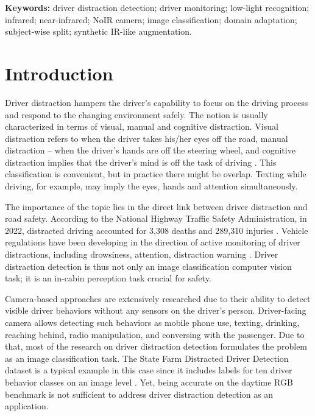 \documentclass[11pt,a4paper]{article}
\let\oldsection\section
\renewcommand{\section}{\FloatBarrier\Needspace{9\baselineskip}\oldsection}
\begin{document}
\vspace{6pt}
\noindent
\textbf{Keywords:} driver distraction detection; driver monitoring; low-light recognition; infrared; near-infrared; NoIR camera; image classification; domain adaptation; subject-wise split; synthetic IR-like augmentation.

\vspace{6pt}

\section{Introduction}

Driver distraction hampers the driver's capability to focus on the driving process and respond to the changing environment safely. The notion is usually characterized in terms of visual, manual and cognitive distraction. Visual distraction refers to when the driver takes his/her eyes off the road, manual distraction – when the driver's hands are off the steering wheel, and cognitive distraction implies that the driver's mind is off the task of driving \parencite{regan2011,kashevnik2021}. This classification is convenient, but in practice there might be overlap. Texting while driving, for example, may imply the eyes, hands and attention simultaneously.

The importance of the topic lies in the direct link between driver distraction and road safety. According to the National Highway Traffic Safety Administration, in 2022, distracted driving accounted for 3,308 deaths and 289,310 injuries \parencite{nhtsa2024}. Vehicle regulations have been developing in the direction of active monitoring of driver distractions, including drowsiness, attention, distraction warning \parencite{eurlex2024}. Driver distraction detection is thus not only an image classification computer vision task; it is an in-cabin perception task crucial for safety.

Camera-based approaches are extensively researched due to their ability to detect visible driver behaviors without any sensors on the driver's person. Driver-facing camera allows detecting such behaviors as mobile phone use, texting, drinking, reaching behind, radio manipulation, and conversing with the passenger. Due to that, most of the research on driver distraction detection formulates the problem as an image classification task. The State Farm Distracted Driver Detection dataset is a typical example in this case since it includes labels for ten driver behavior classes on an image level \parencite{kaggleStateFarm}. Yet, being accurate on the daytime RGB benchmark is not sufficient to address driver distraction detection as an application.
\end{document}
